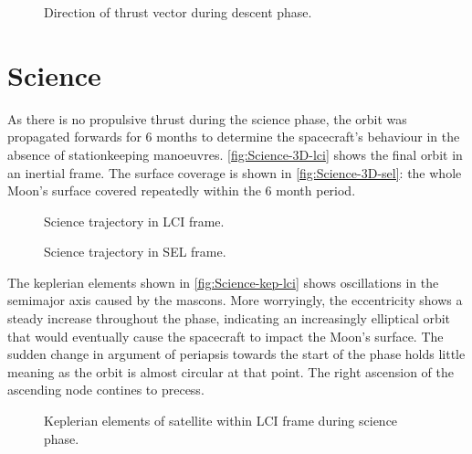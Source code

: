 \begin{figure}
\centering
\def\svgwidth{\figurewidth}

\caption{Direction of thrust vector during descent phase.}
\label{fig:Descent-thrust}
\end{figure}


\clearpage

\section{Science} \label{sec:Science}

As there is no propulsive thrust during the science phase, the orbit was propagated forwards for 6 months to determine the spacecraft's behaviour in the absence of stationkeeping manoeuvres. \autoref{fig:Science-3D-lci} shows the final orbit in an inertial frame. The surface coverage is shown in \autoref{fig:Science-3D-sel}: the whole Moon's surface covered repeatedly within the 6 month period. 

\begin{figure}
\centering
\def\svgwidth{\figurewidth}

\caption{Science trajectory in LCI frame.}
\label{fig:Science-3D-lci}
\end{figure}

\begin{figure}
\centering
\def\svgwidth{\figurewidth}

\caption{Science trajectory in SEL frame.}
\label{fig:Science-3D-sel}
\end{figure}

The keplerian elements shown in \autoref{fig:Science-kep-lci} shows oscillations in the semimajor axis caused by the mascons. More worryingly, the eccentricity shows a steady increase throughout the phase, indicating an increasingly elliptical orbit that would eventually cause the spacecraft to impact the Moon's surface. The sudden change in argument of periapsis towards the start of the phase holds little meaning as the orbit is almost circular at that point. The right ascension of the ascending node contines to precess.

\begin{figure}
\centering
\def\svgwidth{\figurewidth}

\caption{Keplerian elements of satellite within LCI frame during science phase.}
\label{fig:Science-kep-lci}
\end{figure}

